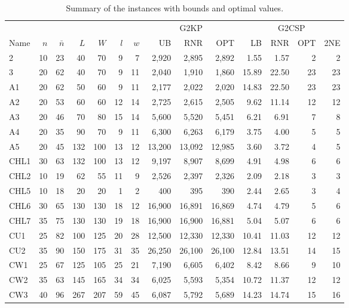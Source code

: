 \documentclass[9pt]{entcs}
\begin{document}
\begin{table}[ht]
\caption{Summary of the instances with bounds and optimal values.}
\begin{tabular}{@{\extracolsep{4pt}}lrrrrrrrrrrrrr@{}}
\hline\hline
& & & & & & & \multicolumn{3}{c}{G2KP} & \multicolumn{4}{c}{G2CSP} \\\cline{8-10}\cline{11-14}
Name & \(n\) & \(\bar{n}\) & \(L\) & \(W\) & \underline{\(l\)} & \underline{\(w\)} & UB & RNR & OPT & LB & RNR & OPT & 2NE\\\hline
2 & 10 & 23 & 40 & 70 & 9 & 7 & 2,920 & 2,895 & 2,892 & 1.55 & 1.57 & 2 & 2 \\
3 & 20 & 62 & 40 & 70 & 9 & 11 & 2,040 & 1,910 & 1,860 & 15.89 & 22.50 & 23 & 23 \\
A1 & 20 & 62 & 50 & 60 & 9 & 11 & 2,177 & 2,022 & 2,020 & 14.83 & 22.50 & 23 & 23 \\
A2 & 20 & 53 & 60 & 60 & 12 & 14 & 2,725 & 2,615 & 2,505 & 9.62 & 11.14 & 12 & 12 \\
A3 & 20 & 46 & 70 & 80 & 15 & 14 & 5,600 & 5,520 & 5,451 & 6.21 & 6.91 & 7 & 8 \\
A4 & 20 & 35 & 90 & 70 & 9 & 11 & 6,300 & 6,263 & 6,179 & 3.75 & 4.00 & 5 & 5 \\
A5 & 20 & 45 & 132 & 100 & 13 & 12 & 13,200 & 13,092 & 12,985 & 3.60 & 3.72 & 4 & 5 \\
CHL1 & 30 & 63 & 132 & 100 & 13 & 12 & 9,197 & 8,907 & 8,699 & 4.91 & 4.98 & 6 & 6 \\
CHL2 & 10 & 19 & 62 & 55 & 11 & 9 & 2,526 & 2,397 & 2,326 & 2.09 & 2.18 & 3 & 3 \\
CHL5 & 10 & 18 & 20 & 20 & 1 & 2 & 400 & 395 & 390 & 2.44 & 2.65 & 3 & 4 \\
CHL6 & 30 & 65 & 130 & 130 & 18 & 12 & 16,900 & 16,891 & 16,869 & 4.74 & 4.79 & 5 & 6 \\
CHL7 & 35 & 75 & 130 & 130 & 19 & 18 & 16,900 & 16,900 & 16,881 & 5.04 & 5.07 & 6 & 6 \\
CU1 & 25 & 82 & 100 & 125 & 20 & 28 & 12,500 & 12,330 & 12,330 & 10.41 & 11.03 & 12 & 12 \\
CU2 & 35 & 90 & 150 & 175 & 31 & 35 & 26,250 & 26,100 & 26,100 & 12.84 & 13.51 & 14 & 15 \\
CW1 & 25 & 67 & 125 & 105 & 25 & 21 & 7,190 & 6,605 & 6,402 & 8.42 & 8.66 & 9 & 10 \\
CW2 & 35 & 63 & 145 & 165 & 34 & 34 & 6,025 & 5,593 & 5,354 & 10.72 & 11.37 & 12 & 12 \\
CW3 & 40 & 96 & 267 & 207 & 59 & 45 & 6,087 & 5,792 & 5,689 & 14.23 & 14.74 & 15 & 16 \\

\end{tabular}
\end{table}
\end{document}
